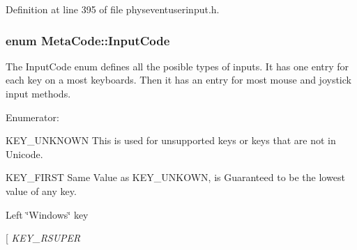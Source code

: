 Definition at line 395 of file physeventuserinput.h.\hypertarget{classMetaCode_a7390e6f58e25c0ce377bba4e63081b24}{
\subsubsection[{InputCode}]{\setlength{\rightskip}{0pt plus 5cm}enum {\bf MetaCode::InputCode}}}
\label{d7/d72/classMetaCode_a7390e6f58e25c0ce377bba4e63081b24}


The InputCode enum defines all the posible types of inputs. It has one entry for each key on a most keyboards. Then it has an entry for most mouse and joystick input methods. \begin{Desc}
\item[Enumerator: ]\par
\begin{description}
\item[{\em 
\hypertarget{classMetaCode_a7390e6f58e25c0ce377bba4e63081b24af7c19e29f8e1299858f9a9a0e2e0df32}{
KEY\_\-FIRST}
\label{d7/d72/classMetaCode_a7390e6f58e25c0ce377bba4e63081b24af7c19e29f8e1299858f9a9a0e2e0df32}
}]KEY\_\-UNKNOWN This is used for unsupported keys or keys that are not in Unicode. \item[{\em 
\hypertarget{classMetaCode_a7390e6f58e25c0ce377bba4e63081b24a11be427f22c538fc5682e0b7fa3e1e6d}{
KEY\_\-BACKSPACE}
\label{d7/d72/classMetaCode_a7390e6f58e25c0ce377bba4e63081b24a11be427f22c538fc5682e0b7fa3e1e6d}
}]KEY\_\-FIRST Same Value as KEY\_\-UNKOWN, is Guaranteed to be the lowest value of any key. \item[{\em 
\hypertarget{classMetaCode_a7390e6f58e25c0ce377bba4e63081b24a6404942e1d26f745d17c7a508c0ffa55}{
KEY\_\-LSUPER}
\label{d7/d72/classMetaCode_a7390e6f58e25c0ce377bba4e63081b24a6404942e1d26f745d17c7a508c0ffa55}
}]Left \char`\"{}Windows\char`\"{} key \item[{\em 
\hypertarget{classMetaCode_a7390e6f58e25c0ce377bba4e63081b24a729875d449534841cde46b53777f7753}{
KEY\_\-RSUPER}
\label{d7/d72/classMetaCode_a7390e6f58e25c0ce377bba4e63081b24a729875d449534841cde46b53777f7753}
}
\end{description}
\end{Desc}
